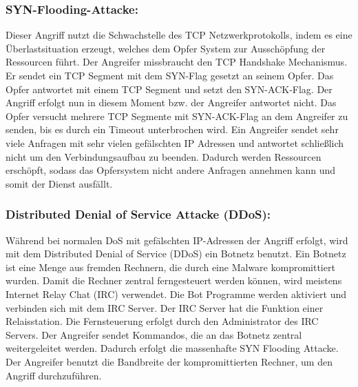 \subsubsection{SYN-Flooding-Attacke:}
Dieser Angriff nutzt die Schwachstelle des TCP Netzwerkprotokolls, indem es eine Überlastsituation erzeugt, welches dem Opfer System zur Ausschöpfung der Ressourcen führt. Der Angreifer missbraucht den TCP Handshake Mechanismus. Er sendet ein TCP Segment mit dem SYN-Flag gesetzt an seinem Opfer. Das Opfer antwortet mit einem TCP Segment und setzt den SYN-ACK-Flag. Der Angriff erfolgt nun in diesem Moment bzw. der Angreifer antwortet nicht. Das Opfer versucht mehrere TCP Segmente mit SYN-ACK-Flag an dem Angreifer zu senden, bis es durch ein Timeout unterbrochen wird. Ein Angreifer sendet sehr viele Anfragen mit sehr vielen gefälschten IP Adressen und antwortet schließlich nicht um den Verbindungsaufbau zu beenden. Dadurch werden Ressourcen erschöpft, sodass das Opfersystem nicht andere Anfragen annehmen kann und somit der Dienst ausfällt.\cite{ref_book_attack_3}\par

\subsubsection{Distributed Denial of Service Attacke (DDoS):}
Während bei normalen DoS mit gefälschten IP-Adressen der Angriff erfolgt, wird mit dem Distributed Denial of Service (DDoS) ein Botnetz benutzt. Ein Botnetz ist eine Menge aus fremden Rechnern, die durch eine Malware kompromittiert wurden. Damit die Rechner zentral ferngesteuert werden können, wird meistens Internet Relay Chat (IRC) verwendet. Die Bot Programme werden aktiviert und verbinden sich mit dem IRC Server. Der IRC Server hat die Funktion einer Relaisstation. Die Fernsteuerung erfolgt durch den Administrator des IRC Servers. Der Angreifer sendet Kommandos, die an das Botnetz zentral weitergeleitet werden. Dadurch erfolgt die massenhafte SYN Flooding Attacke. Der Angreifer benutzt die Bandbreite der kompromittierten Rechner, um den Angriff durchzuführen.\cite{ref_book_attack_7}\par
